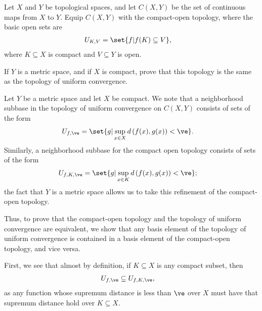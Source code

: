 \documentclass[10pt]{mypackage}
\begin{document}
\begin{problem}[Problem 7]
  Let $X$ and $Y$ be topological spaces, and let $C\left( X,Y \right)$ be the set of continuous maps from $X$ to $Y$. Equip $C\left( X,Y \right)$ with the compact-open topology, where the basic open sets are
  \begin{align*}
    U_{K,V} &= \set{f | f(K)\subseteq V},
  \end{align*}
  where $K\subseteq X$ is compact and $V\subseteq Y$ is open.\newline

  If $Y$ is a metric space, and if $X$ is compact, prove that this topology is the same as the topology of uniform convergence.
\end{problem}
\begin{solution}
  Let $Y$ be a metric space and let $X$ be compact. We note that a neighborhood subbase in the topology of uniform convergence on $C\left( X,Y \right)$ consists of sets of the form
  \begin{align*}
    U_{f,\ve} &= \set{g | \sup_{x\in X}d\left( f(x),g(x) \right) < \ve}.
  \end{align*}
  Similarly, a neighborhood subbase for the compact open topology consists of sets of the form
  \begin{align*}
    U_{f,K,\ve} &= \set{g | \sup_{x\in K}d\left( f(x),g(x) \right) < \ve};
  \end{align*}
  the fact that $Y$ is a metric space allows us to take this refinement of the compact-open topology.\newline

  Thus, to prove that the compact-open topology and the topology of uniform convergence are equivalent, we show that any basis element of the topology of uniform convergence is contained in a basis element of the compact-open topology, and vice versa.\newline

  First, we see that almost by definition, if $K\subseteq X$ is any compact subset, then
  \begin{align*}
    U_{f,\ve} &\subseteq U_{f,K,\ve},
  \end{align*}
  as any function whose supremum distance is less than $\ve$ over $X$ must have that supremum distance hold over $K\subseteq X$.\newline


\end{solution}
\end{document}
